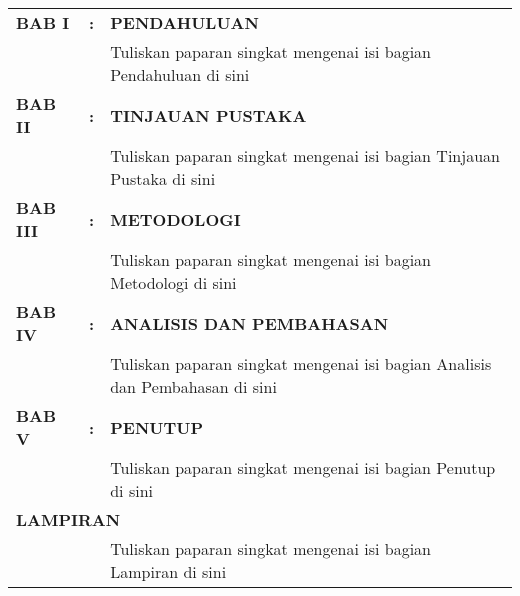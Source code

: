 \begin{tabular}{ p{} p{} p{}}
    \textbf{BAB I}  & \textbf{:} &
    \textbf{PENDAHULUAN} \\
    && 
    Tuliskan paparan singkat mengenai isi bagian Pendahuluan di sini \\ 
    \textbf{BAB II}  & \textbf{:} &
    \textbf{TINJAUAN PUSTAKA} \\
    &&
    Tuliskan paparan singkat mengenai isi bagian Tinjauan Pustaka di sini \\
    \textbf{BAB III}  & \textbf{:} &
    \textbf{METODOLOGI} \\
    && 
    Tuliskan paparan singkat mengenai isi bagian Metodologi di sini \\ 
    \textbf{BAB IV} & \textbf{:} &
    \textbf{ANALISIS DAN PEMBAHASAN} \\
    && 
    Tuliskan paparan singkat mengenai isi bagian Analisis dan Pembahasan di sini \\
    \textbf{BAB V} & \textbf{:} &
    \textbf{PENUTUP} \\
    && 
    Tuliskan paparan singkat mengenai isi bagian Penutup di sini \\
    \multicolumn{3}{l}{\textbf{LAMPIRAN}}\\
    &&
    Tuliskan paparan singkat mengenai isi bagian Lampiran di sini \\
\end{tabular}

